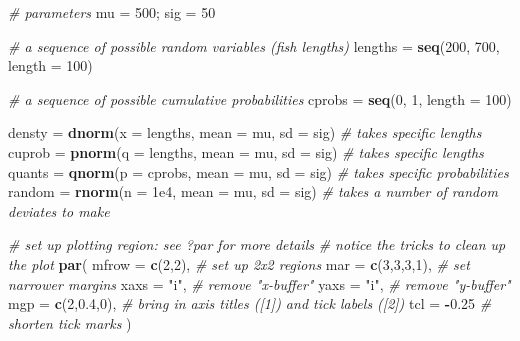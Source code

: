 \documentclass[]{book}
\newenvironment{Shaded}{\begin{snugshade}}{\end{snugshade}}
\newcommand{\KeywordTok}[1]{\textcolor[rgb]{0.13,0.29,0.53}{\textbf{#1}}}
\newcommand{\DataTypeTok}[1]{\textcolor[rgb]{0.13,0.29,0.53}{#1}}
\newcommand{\DecValTok}[1]{\textcolor[rgb]{0.00,0.00,0.81}{#1}}
\newcommand{\FloatTok}[1]{\textcolor[rgb]{0.00,0.00,0.81}{#1}}
\newcommand{\StringTok}[1]{\textcolor[rgb]{0.31,0.60,0.02}{#1}}
\newcommand{\CommentTok}[1]{\textcolor[rgb]{0.56,0.35,0.01}{\textit{#1}}}
\newcommand{\OperatorTok}[1]{\textcolor[rgb]{0.81,0.36,0.00}{\textbf{#1}}}
\newcommand{\NormalTok}[1]{#1}
\theoremstyle{definition}
\theoremstyle{definition}
\theoremstyle{definition}
\theoremstyle{remark}
\begin{document}
\begin{Shaded}
\begin{Highlighting}[]
\CommentTok{# parameters}
\NormalTok{mu =}\StringTok{ }\DecValTok{500}\NormalTok{; sig =}\StringTok{ }\DecValTok{50}

\CommentTok{# a sequence of possible random variables (fish lengths)}
\NormalTok{lengths =}\StringTok{ }\KeywordTok{seq}\NormalTok{(}\DecValTok{200}\NormalTok{, }\DecValTok{700}\NormalTok{, }\DataTypeTok{length =} \DecValTok{100}\NormalTok{)}

\CommentTok{# a sequence of possible cumulative probabilities}
\NormalTok{cprobs =}\StringTok{ }\KeywordTok{seq}\NormalTok{(}\DecValTok{0}\NormalTok{, }\DecValTok{1}\NormalTok{, }\DataTypeTok{length =} \DecValTok{100}\NormalTok{)}

\NormalTok{densty =}\StringTok{ }\KeywordTok{dnorm}\NormalTok{(}\DataTypeTok{x =}\NormalTok{ lengths, }\DataTypeTok{mean =}\NormalTok{ mu, }\DataTypeTok{sd =}\NormalTok{ sig)  }\CommentTok{# takes specific lengths}
\NormalTok{cuprob =}\StringTok{ }\KeywordTok{pnorm}\NormalTok{(}\DataTypeTok{q =}\NormalTok{ lengths, }\DataTypeTok{mean =}\NormalTok{ mu, }\DataTypeTok{sd =}\NormalTok{ sig)  }\CommentTok{# takes specific lengths}
\NormalTok{quants =}\StringTok{ }\KeywordTok{qnorm}\NormalTok{(}\DataTypeTok{p =}\NormalTok{ cprobs, }\DataTypeTok{mean =}\NormalTok{ mu, }\DataTypeTok{sd =}\NormalTok{ sig)   }\CommentTok{# takes specific probabilities}
\NormalTok{random =}\StringTok{ }\KeywordTok{rnorm}\NormalTok{(}\DataTypeTok{n =} \FloatTok{1e4}\NormalTok{, }\DataTypeTok{mean =}\NormalTok{ mu, }\DataTypeTok{sd =}\NormalTok{ sig)      }\CommentTok{# takes a number of random deviates to make}

\CommentTok{# set up plotting region: see ?par for more details}
\CommentTok{# notice the tricks to clean up the plot}
\KeywordTok{par}\NormalTok{(}
  \DataTypeTok{mfrow =} \KeywordTok{c}\NormalTok{(}\DecValTok{2}\NormalTok{,}\DecValTok{2}\NormalTok{),    }\CommentTok{# set up 2x2 regions}
  \DataTypeTok{mar =} \KeywordTok{c}\NormalTok{(}\DecValTok{3}\NormalTok{,}\DecValTok{3}\NormalTok{,}\DecValTok{3}\NormalTok{,}\DecValTok{1}\NormalTok{),  }\CommentTok{# set narrower margins}
  \DataTypeTok{xaxs =} \StringTok{"i"}\NormalTok{,        }\CommentTok{# remove "x-buffer"}
  \DataTypeTok{yaxs =} \StringTok{"i"}\NormalTok{,        }\CommentTok{# remove "y-buffer"}
  \DataTypeTok{mgp =} \KeywordTok{c}\NormalTok{(}\DecValTok{2}\NormalTok{,}\FloatTok{0.4}\NormalTok{,}\DecValTok{0}\NormalTok{),  }\CommentTok{# bring in axis titles ([1]) and tick labels ([2])}
  \DataTypeTok{tcl =} \OperatorTok{-}\FloatTok{0.25}        \CommentTok{# shorten tick marks}
\NormalTok{)}


\end{Highlighting}
\end{Shaded}
\end{document}
